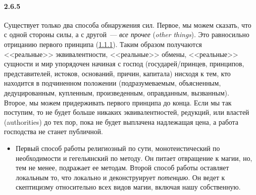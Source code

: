 \paragraph{2.6.5}\hypertarget{par:2.6.5}{} Существует только два способа обнаружения сил. Первое, мы можем сказать, что с одной стороны силы, а с другой~--- {\itshape все прочее} ({\itshape other things}). Это равносильно отрицанию первого принципа (\hyperlink{par:1.1.1}{1.1.1}). Таким образом получаются <<реальные>> эквивалентности, <<реальные>> обмены, <<реальные>> сущности и мир упорядочен начиная с господ (государей/принцев, принципов, представителей, истоков, оснований, причин, капитала) нисходя к тем, кто находится в подчиненном положении (подразумеваемым, объясненным, дедуцированным, купленным, произведенным, оправданным, вызванным). Второе, мы можем придерживать первого принципа до конца. Если мы так поступим, то не будет больше никаких эквивалентностей, редукций, или властей (authorities) до тех пор, пока не будет выплачена надлежащая цена, а работа господства не станет публичной. 
	\begin{itemize}
	\item 
	Первый способ работы религиозный по сути, монотеистический по необходимости и гегельянский по методу. Он питает отвращение к магии, но, тем не менее, подражает ее методам. Второй способ работы оставляет локальным то, что локально и деконструирует {\itshape потенцию}. Он ведет к скептицизму относительно всех видов магии, включая нашу собственную.
	\end{itemize}


